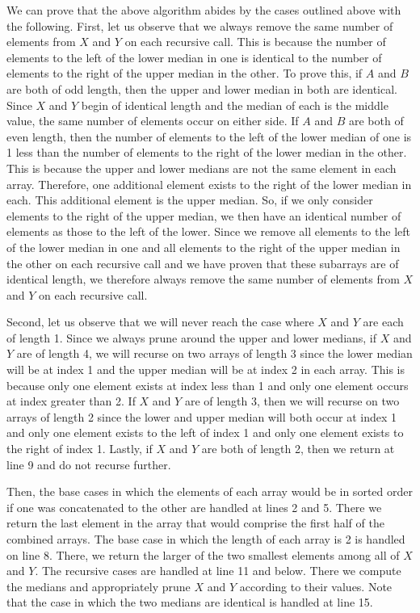 \documentclass[11pt]{article}
\begin{document}
We can prove that the above algorithm abides by the cases outlined above with the following. First, let us observe that we always remove the same number of elements from $X$ and $Y$ on each recursive call. This is because the number of elements to the left of the lower median in one is identical to the number of elements to the right of the upper median in the other. To prove this, if $A$ and $B$ are both of odd length, then the upper and lower median in both are identical. Since $X$ and $Y$ begin of identical length and the median of each is the middle value, the same number of elements occur on either side. If $A$ and $B$ are both of even length, then the number of elements to the left of the lower median of one is 1 less than the number of elements to the right of the lower median in the other. This is because the upper and lower medians are not the same element in each array. Therefore, one additional element exists to the right of the lower median in each. This additional element is the upper median. So, if we only consider elements to the right of the upper median, we then have an identical number of elements as those to the left of the lower. Since we remove all elements to the left of the lower median in one and all elements to the right of the upper median in the other on each recursive call and we have proven that these subarrays are of identical length, we therefore always remove the same number of elements from $X$ and $Y$ on each recursive call.

Second, let us observe that we will never reach the case where $X$ and $Y$ are each of length 1. Since we always prune around the upper and lower medians, if $X$ and $Y$ are of length 4, we will recurse on two arrays of length 3 since the lower median will be at index 1 and the upper median will be at index 2 in each array. This is because only one element exists at index less than 1 and only one element occurs at index greater than 2. If $X$ and $Y$ are of length 3, then we will recurse on two arrays of length 2 since the lower and upper median will both occur at index 1 and only one element exists to the left of index 1 and only one element exists to the right of index 1. Lastly, if $X$ and $Y$ are both of length 2, then we return at line 9 and do not recurse further.

Then, the base cases in which the elements of each array would be in sorted order if one was concatenated to the other are handled at lines 2 and 5. There we return the last element in the array that would comprise the first half of the combined arrays. The base case in which the length of each array is 2 is handled on line 8. There, we return the larger of the two smallest elements among all of $X$ and $Y$. The recursive cases are handled at line 11 and below. There we compute the medians and appropriately prune $X$ and $Y$ according to their values. Note that the case in which the two medians are identical is handled at line 15.
\end{document}
